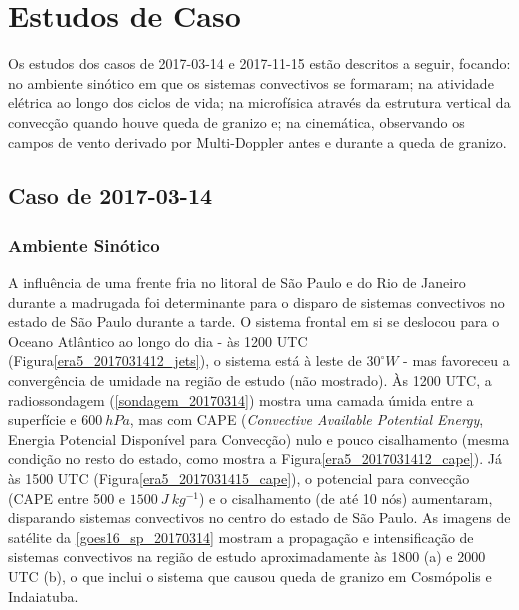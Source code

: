\section{Estudos de Caso}\label{estudo_casos}

Os estudos dos casos de 2017-03-14 e 2017-11-15 estão descritos a seguir, focando: no ambiente sinótico em que os sistemas convectivos se formaram; na atividade elétrica ao longo dos ciclos de vida; na microfísica através da estrutura vertical da convecção quando houve queda de granizo e; na cinemática, observando os campos de vento derivado por Multi-Doppler antes e durante a queda de granizo.

\subsection{Caso de 2017-03-14}

\subsubsection{Ambiente Sinótico}\label{sinotica_201703014}

A influência de uma frente fria no litoral de São Paulo e do Rio de Janeiro durante a madrugada foi determinante para o disparo de sistemas convectivos no estado de São Paulo durante a tarde. O sistema frontal em si se deslocou para o Oceano Atlântico ao longo do dia - às 1200 UTC (Figura\autoref{era5_2017031412_jets}), o sistema está à leste de $30^{\circ}W$ - mas favoreceu a convergência de umidade na região de estudo (não mostrado). Às 1200 UTC, a radiossondagem (\autoref{sondagem_20170314}) mostra uma camada úmida entre a superfície e $600\:hPa$, mas com CAPE (\textit{Convective Available Potential Energy}, Energia Potencial Disponível para Convecção) nulo e pouco cisalhamento (mesma condição no resto do estado, como mostra a Figura\autoref{era5_2017031412_cape}). Já às 1500 UTC (Figura\autoref{era5_2017031415_cape}), o potencial para convecção (CAPE entre 500 e $1500\:J\:kg^{-1}$) e o cisalhamento (de até 10 nós) aumentaram, disparando sistemas convectivos no centro do estado de São Paulo. As imagens de satélite da \autoref{goes16_sp_20170314} mostram a propagação e intensificação de sistemas convectivos na região de estudo aproximadamente às 1800 (a) e 2000 UTC (b), o que inclui o sistema que causou queda de granizo em Cosmópolis e Indaiatuba.

